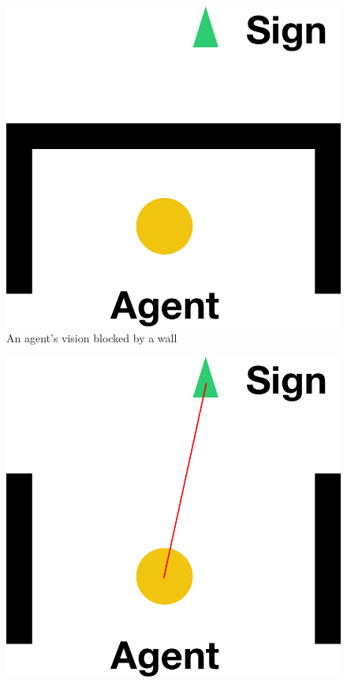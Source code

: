 \documentclass[11pt]{article}
\begin{document}
\begin{itemize}
    \begin{minipage}{.1\textwidth}	
	\vfill\hfill
	\end{minipage}
    \begin{minipage}{.3\textwidth}
		\begin{figure}[H]
		\centering
		\includegraphics[width=1\linewidth]{assets/raytrace-blocked}\\
		An agent's vision blocked by a wall
	\end{figure}
	\end{minipage}
	\begin{minipage}{.2\textwidth}	
	\vfill\hfill
	\end{minipage}
	\begin{minipage}{.3\textwidth}
		\begin{figure}[H]
		\centering
		\includegraphics[width=1\linewidth]{assets/raytrace-visible}\\

\end{figure}
\end{minipage}
\end{itemize}
\end{document}
